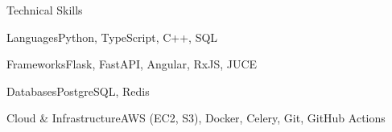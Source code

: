 \documentclass[
	11pt
]{../../../template}
\begin{document}
	\begin{rSection}{T}{echnical Skills}
		\begin{rSet}{Languages}{Python, TypeScript, C++, SQL}
		\end{rSet}
		\begin{rSet}{Frameworks}{Flask, FastAPI, Angular, RxJS, JUCE}
		\end{rSet}
		\begin{rSet}{Databases}{PostgreSQL, Redis}
		\end{rSet}
		\begin{rSet}{Cloud \& Infrastructure}{AWS (EC2, S3), Docker, Celery, Git, GitHub Actions}
		\end{rSet}
	\end{rSection}
\end{document}

